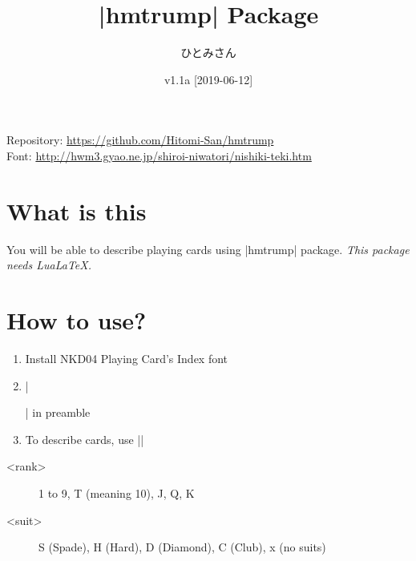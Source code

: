 \documentclass{jlreq}
\title{|hmtrump| Package}
\author{ひとみさん}
\date{v1.1a [2019-06-12]}
\begin{document}
\maketitle

\begin{center}
Repository: \url{https://github.com/Hitomi-San/hmtrump}\\
Font: \url{http://hwm3.gyao.ne.jp/shiroi-niwatori/nishiki-teki.htm}
\end{center}

\hrulefill
\tableofcontents
\pagebreak

\section{What is this}
You will be able to describe playing cards using |hmtrump| package.
\emph{This package needs LuaLaTeX.}


\section{How to use?}
\begin{enumerate}
\item Install NKD04 Playing Card's Index font
\item |\usepackage{hmtrump}| in preamble
\item To describe cards, use ||
\end{enumerate}

\begin{description}
\item[<rank>] 1 to 9, T (meaning 10), J, Q, K
\item[<suit>] S (Spade), H (Hard), D (Diamond), C (Club), x (no suits)
\end{description}
\end{document}
